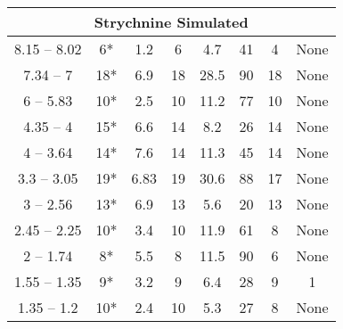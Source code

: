 \begin{landscape}
\begin{longtable}{cccccccc}
        \hline
        \multicolumn{8}{c}{\textbf{Strychnine Simulated}}\\
        \hline
        8.15 -- 8.02 &
        6* &
        1.2 &
        6 &
        4.7 &
        41 &
        4 &
        None\\
        7.34 -- 7 &
        18* &
        6.9 &
        18 &
        28.5 &
        90 &
        18 &
        None\\
        6 -- 5.83 &
        10* &
        2.5 &
        10 &
        11.2 &
        77 &
        10 &
        None\\
        4.35 -- 4 &
        15* &
        6.6 &
        14 &
        8.2 &
        26 &
        14 &
        None\\
        4 -- 3.64 &
        14* &
        7.6 &
        14 &
        11.3 &
        45 &
        14 &
        None\\
        3.3 -- 3.05 &
        19* &
        6.83 &
        19 &
        30.6 &
        88 &
        17 &
        None\\
        3 -- 2.56 &
        13* &
        6.9 &
        13 &
        5.6 &
        20 &
        13 &
        None\\
        2.45 -- 2.25 &
        10* &
        3.4 &
        10 &
        11.9 &
        61 &
        8 &
        None\\
        2 -- 1.74 &
        8* &
        5.5 &
        8 &
        11.5 &
        90 &
        6 &
        None\\
        1.55 -- 1.35 &
        9* &
        3.2 &
        9 &
        6.4 &
        28 &
        9 &
        1\\
        1.35 -- 1.2 &
        10* &
        2.4 &
        10 &
        5.3 &
        27 &
        8 &
        None\\


\end{longtable}
\end{landscape}
